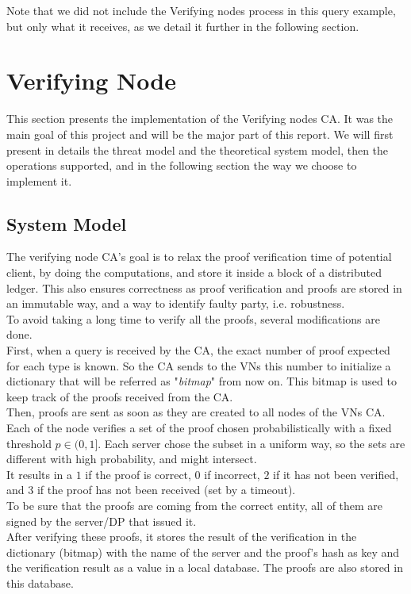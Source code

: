 \documentclass{article}
\begin{document}
Note that we did not include the Verifying nodes process in this query example, but only what it receives, as we detail it further in the following section.

\section{Verifying  Node}
This section presents the implementation of the Verifying nodes CA. It was the main goal of this project and will be the major part of this report. We will first present in details the threat model and the theoretical system model, then the operations supported, and in the following section the way we choose to implement it.\\
\subsection{System Model}
The verifying node CA's goal is to relax the proof verification time of potential client, by doing the computations, and store it inside a block of a distributed ledger. This also ensures correctness as proof verification and proofs are stored in an immutable way, and a way to identify faulty party, i.e. robustness.\\
To avoid taking a long time to verify all the proofs, several modifications are done.\\
First, when a query is received by the CA, the exact number of proof expected for each type is known. So the CA sends to the VNs this number to initialize a dictionary that will be referred as "\textit{bitmap}" from now on. This bitmap is used to keep track of the proofs received from the CA.\\
Then, proofs are sent as soon as they are created to all nodes of the VNs CA. Each of the node verifies a set of the proof chosen probabilistically with a fixed threshold $p \in (0,1]$. Each server chose the subset in a uniform way, so the sets are different with high probability, and might intersect.\\
It results in a $1$ if the proof is correct, $0$ if incorrect, $2$ if it has not been verified, and 3 if the proof has not been received (set by a timeout).\\
To be sure that the proofs are coming from the correct entity, all of them are signed by the server/DP that issued it.\\
After verifying these proofs, it stores the result of the verification in the dictionary (bitmap) with the name of the server and the proof's hash as key and the verification result as a value in a local database. The proofs are also stored in this database.\\
\end{document}

